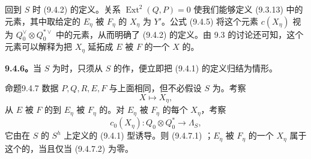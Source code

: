 回到 $S$ 时 (9.4.2) 的定义。关系 $\operatorname{Ext}^2(Q,P)=0$ 使我们能够定义 (9.3.13) 中的元素，其中取给定的 $E_\eta$ 被 $F_\eta$ 的 $X_\eta$ 为 $Y'$。公式 (9.4.5) 将这个元素 $c(X_\eta)$ 视为 $Q_0^\vee\otimes Q_0^{*\vee}$ 中的元素，从而明确了 (9.4.2) 的定义。由 9.3 的讨论还可知，这个元素可以解释为把 $X_\eta$ 延拓成 $E$ 被 $F$ 的一个 $X$ 的。

\textbf{9.4.6。}当 $S$ 为时，只须从 $S$ 的作，便立即把 (9.4.1) 的定义归结为情形。

\begin{SGAresult}{命题}{9.4.7}
数据 $P,Q,R,E,F$ 与上面相同，但不必假设 $S$ 为。考察
\begin{equation}\tag{9.4.7.1}
 X\longmapsto X_\eta,
\end{equation}
从 $E$ 被 $F$ 的到 $E_\eta$ 被 $F_\eta$ 的。对 $E_\eta$ 被 $F_\eta$ 的每个 $X_\eta$，考察
\begin{equation}\tag{9.4.7.2}
 c_0(X_\eta):Q_0\otimes Q_0^*\longrightarrow\Lambda_S,
\end{equation}
它由在 $S$ 的 $S^h$ 上定义的 (9.4.1) 型诱导。则 (9.4.7.1) ；$E_\eta$ 被 $F_\eta$ 的一个 $X_\eta$ 属于这个的，当且仅当 (9.4.7.2) 为零。
\end{SGAresult}

